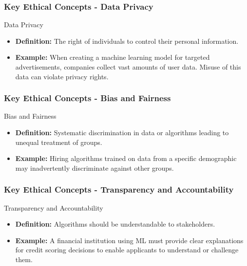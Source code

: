 \documentclass[aspectratio=169]{beamer}
\begin{document}
\begin{frame}[fragile]
    \frametitle{Key Ethical Concepts - Data Privacy}
    \begin{block}{Data Privacy}
        \begin{itemize}
            \item \textbf{Definition:} The right of individuals to control their personal information.
            \item \textbf{Example:} When creating a machine learning model for targeted advertisements, 
            companies collect vast amounts of user data. Misuse of this data can violate privacy rights.
        \end{itemize}
    \end{block}
\end{frame}

\begin{frame}[fragile]
    \frametitle{Key Ethical Concepts - Bias and Fairness}
    \begin{block}{Bias and Fairness}
        \begin{itemize}
            \item \textbf{Definition:} Systematic discrimination in data or algorithms 
            leading to unequal treatment of groups.
            \item \textbf{Example:} Hiring algorithms trained on data from a specific demographic 
            may inadvertently discriminate against other groups.
        \end{itemize}
    \end{block}
\end{frame}

\begin{frame}[fragile]
    \frametitle{Key Ethical Concepts - Transparency and Accountability}
    \begin{block}{Transparency and Accountability}
        \begin{itemize}
            \item \textbf{Definition:} Algorithms should be understandable to stakeholders.
            \item \textbf{Example:} A financial institution using ML must provide clear explanations 
            for credit scoring decisions to enable applicants to understand or challenge them.
        \end{itemize}
    \end{block}
\end{frame}
\end{document}
